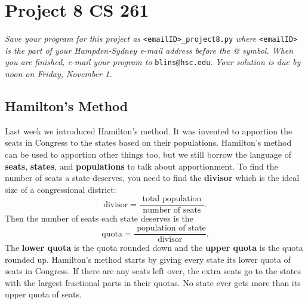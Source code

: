 \documentclass[12pt]{article}
\begin{document}
\section*{Project 8 \hfill CS 261}

\textit{Save your program for this project as} \verb|<emailID>_project8.py| \textit{where} \verb|<emailID>| \textit{is the part of your Hampden-Sydney e-mail address before the @ symbol. When you are finished, e-mail your program to} \verb|blins@hsc.edu|. \textit{Your solution is due by noon on Friday, November 1. }

\subsection*{Hamilton's Method}

Last week we introduced Hamilton's method. It was invented to apportion the seats in Congress to the states based on their populations. Hamilton's method can be used to apportion other things too, but we still borrow the language of \textbf{seats}, \textbf{states}, and \textbf{populations} to talk about apportionment.  To find the number of seats a state deserves, you need to find the \textbf{divisor} which is the ideal size of a congressional district:
$$\text{divisor} = \frac{ \text{ total population }}{\text{ number of seats }}.$$
Then the number of seats each state deserves is the  
$$\text{quota} = \frac{ \text{ population of state}}{\text{ divisor }}.$$
The \textbf{lower quota} is the quota rounded down and the \textbf{upper quota} is the quota rounded up. Hamilton's method starts by giving every state its lower quota of seats in Congress.  If there are any seats left over, the extra seats go to the states with the largest fractional parts in their quotas.  No state ever gets more than its upper quota of seats.
\end{document}
